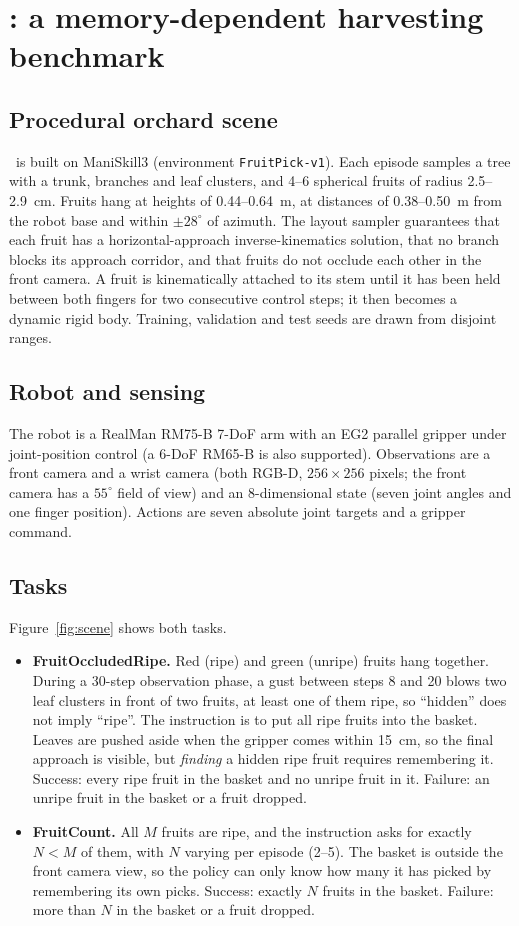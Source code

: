 \section{\bench: a memory-dependent harvesting benchmark}
\label{sec:benchmark}

\subsection{Procedural orchard scene}
\bench\ is built on ManiSkill3 \citep{tao2025maniskill3} (environment \texttt{FruitPick-v1}). Each episode samples a tree with a trunk, branches and leaf clusters, and 4--6 spherical fruits of radius 2.5--2.9~cm. Fruits hang at heights of 0.44--0.64~m, at distances of 0.38--0.50~m from the robot base and within $\pm 28^\circ$ of azimuth. The layout sampler guarantees that each fruit has a horizontal-approach inverse-kinematics solution, that no branch blocks its approach corridor, and that fruits do not occlude each other in the front camera. A fruit is kinematically attached to its stem until it has been held between both fingers for two consecutive control steps; it then becomes a dynamic rigid body. Training, validation and test seeds are drawn from disjoint ranges.

\subsection{Robot and sensing}
The robot is a RealMan RM75-B 7-DoF arm with an EG2 parallel gripper under joint-position control (a 6-DoF RM65-B is also supported). Observations are a front camera and a wrist camera (both RGB-D, $256\times256$ pixels; the front camera has a $55^\circ$ field of view) and an 8-dimensional state (seven joint angles and one finger position). Actions are seven absolute joint targets and a gripper command.

\subsection{Tasks}
\label{sec:tasks}
Figure~\ref{fig:scene} shows both tasks.
\begin{itemize}
\item \textbf{FruitOccludedRipe.} Red (ripe) and green (unripe) fruits hang together. During a 30-step observation phase, a gust between steps 8 and 20 blows two leaf clusters in front of two fruits, at least one of them ripe, so ``hidden'' does not imply ``ripe''. The instruction is to put all ripe fruits into the basket. Leaves are pushed aside when the gripper comes within 15~cm, so the final approach is visible, but \emph{finding} a hidden ripe fruit requires remembering it. Success: every ripe fruit in the basket and no unripe fruit in it. Failure: an unripe fruit in the basket or a fruit dropped.
\item \textbf{FruitCount.} All $M$ fruits are ripe, and the instruction asks for exactly $N<M$ of them, with $N$ varying per episode (2--5). The basket is outside the front camera view, so the policy can only know how many it has picked by remembering its own picks. Success: exactly $N$ fruits in the basket. Failure: more than $N$ in the basket or a fruit dropped.
\end{itemize}

